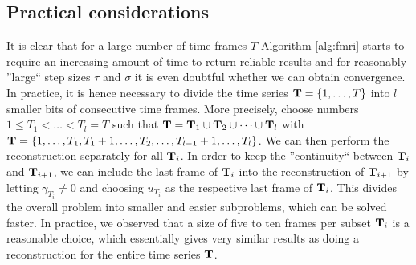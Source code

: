 \subsection{Practical considerations}
It is clear that for a large number of time frames $T$ Algorithm \ref{alg:fmri} starts to require an increasing amount of time to return reliable results and for reasonably ''large`` step sizes $\tau$ and $\sigma$ it is even doubtful whether we can obtain convergence. 
In practice, it is hence necessary to divide the time series $\mathbf{T} = \{1, \dots, T\}$ into $l$ smaller bits of consecutive time frames. More precisely, choose numbers $1 \leq T_1 < \dots < T_l = T$ such that $\mathbf{T} = \mathbf{T}_1 \cup \mathbf{T}_2 \cup \dots \cup \mathbf{T}_l$ with $\mathbf{T} = \{1, \dots, T_1, T_1+1, \dots, T_2, \dots, T_{l-1}+1, \dots, T_l\}$.
We can then perform the reconstruction separately for all $\mathbf{T}_i$. 
In order to keep the ''continuity`` between $\mathbf{T}_i$ and $\mathbf{T}_{i+1}$, we can include the last frame of $\mathbf{T}_i$ into the reconstruction of $\mathbf{T}_{i+1}$ by letting $\gamma_{T_i} \neq 0$ and choosing $u_{T_i}$ as the respective last frame of $\mathbf{T}_i$.
This divides the overall problem into smaller and easier subproblems, which can be solved faster.
In practice, we observed that a size of five to ten frames per subset $\mathbf{T}_i$ is a reasonable choice, which essentially gives very similar results as doing a reconstruction for the entire time series $\mathbf{T}$.






